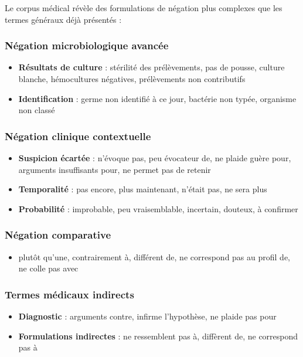 Le corpus médical révèle des formulations de négation plus complexes que les termes généraux déjà présentés :

\subsubsection{Négation microbiologique avancée}

\begin{itemize}
    \item \textbf{Résultats de culture} : stérilité des prélèvements, pas de pousse, culture blanche, hémocultures négatives, prélèvements non contributifs
    \item \textbf{Identification} : germe non identifié à ce jour, bactérie non typée, organisme non classé
\end{itemize}

\subsubsection{Négation clinique contextuelle}

\begin{itemize}
    \item \textbf{Suspicion écartée} : n'évoque pas, peu évocateur de, ne plaide guère pour, arguments insuffisants pour, ne permet pas de retenir
    \item \textbf{Temporalité} : pas encore, plus maintenant, n'était pas, ne sera plus
    \item \textbf{Probabilité} : improbable, peu vraisemblable, incertain, douteux, à confirmer
\end{itemize}

\subsubsection{Négation comparative}

\begin{itemize}
    \item plutôt qu'une, contrairement à, différent de, ne correspond pas au profil de, ne colle pas avec
\end{itemize}

\subsubsection{Termes médicaux indirects}

\begin{itemize}
    \item \textbf{Diagnostic} : arguments contre, infirme l'hypothèse, ne plaide pas pour
    \item \textbf{Formulations indirectes} : ne ressemblent pas à, diffèrent de, ne correspond pas à
\end{itemize}

